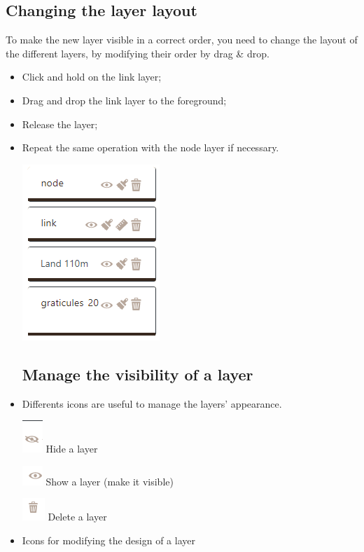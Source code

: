 \documentclass[
  letterpaper,
  DIV=11,
  numbers=noendperiod]{scrreprt}
\begin{document}
\subsection{Changing the layer layout}\label{changing-the-layer-layout}

To make the new layer visible in a correct order, you need to change the
layout of the different layers, by modifying their order by drag \&
drop.

\begin{itemize}
\item
  Click and hold on the link layer;
\item
  Drag and drop the link layer to the foreground;
\item
  Release the layer;
\item
  Repeat the same operation with the node layer if necessary.

  \includegraphics{images/Dispositions_all_change.png}

  \subsection{Manage the visibility of a
  layer}\label{manage-the-visibility-of-a-layer}
\item
  Differents icons are useful to manage the layers' appearance.

  \includegraphics{images/buton_hide.png} Hide a layer

  \includegraphics{images/Buton_show.png} Show a layer (make it visible)

  \includegraphics{images/Buton_action_delete.png} Delete a layer
\item
  Icons for modifying the design of a layer
\end{itemize}
\end{document}
